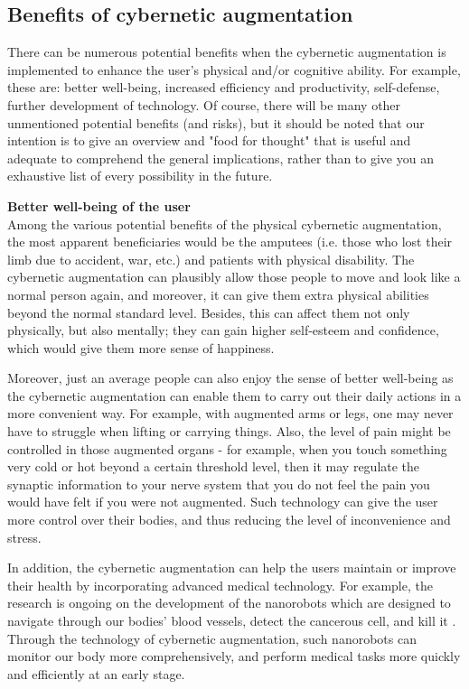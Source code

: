 \subsection{Benefits of cybernetic augmentation}

There can be numerous potential benefits when the cybernetic augmentation is implemented to enhance the user's physical and/or cognitive ability. For example, these are: better well-being, increased efficiency and productivity, self-defense, further development of technology. Of course, there will be many other unmentioned potential benefits (and risks), but it should be noted that our intention is to give an overview and "food for thought" that is useful and adequate to comprehend the general implications, rather than to give you an exhaustive list of every possibility in the future. 


{\bf Better well-being of the user} \\
Among the various potential benefits of the physical cybernetic augmentation, the most apparent beneficiaries would be the amputees (i.e. those who lost their limb due to accident, war, etc.) and patients with physical disability. The cybernetic augmentation can plausibly allow those people to move and look like a normal person again, and moreover, it can give them extra physical abilities beyond the normal standard level. Besides, this can affect them not only physically, but also mentally; they can gain higher self-esteem and confidence, which would give them more sense of happiness. 

Moreover, just an average people can also enjoy the sense of better well-being as the cybernetic augmentation can enable them to carry out their daily actions in a more convenient way. For example, with augmented arms or legs, one may never have to struggle when lifting or carrying things. Also, the level of pain might be controlled in those augmented organs - for example, when you touch something very cold or hot beyond a certain threshold level, then it may regulate the synaptic information to your nerve system that you do not feel the pain you would have felt if you were not augmented. Such technology can give the user more control over their bodies, and thus reducing the level of inconvenience and stress.

In addition, the cybernetic augmentation can help the users maintain or improve their health by incorporating advanced medical technology. For example, the research is ongoing on the development of the nanorobots which are designed to navigate through our bodies' blood vessels, detect the cancerous cell, and kill it \cite{nanorobot}. Through the technology of cybernetic augmentation, such nanorobots can monitor our body more comprehensively, and perform medical tasks more quickly and efficiently at an early stage. 

